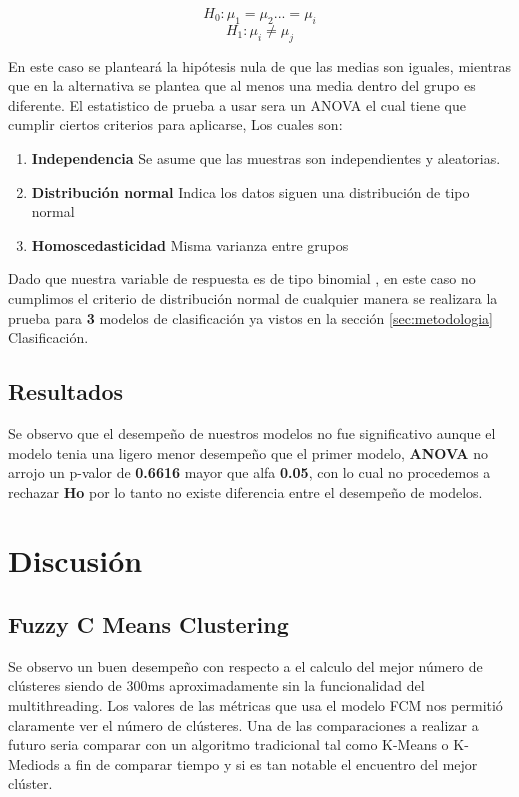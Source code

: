 \documentclass[10pt,journal]{IEEEtran}
\begin{document}
\begin{equation}
H_0 : \mu_1 = \mu_2 ... = \mu_i
\end{equation}
\begin{equation}
H_1 : \mu_i \neq \mu_j 
\end{equation}


En este caso se planteará la hipótesis nula de que las medias son iguales, mientras que en la alternativa se plantea que al menos una media dentro del grupo es diferente.
El estatistico de prueba a usar sera un ANOVA el cual tiene que cumplir ciertos criterios para aplicarse, Los cuales son:

\begin{enumerate}
    \item \textbf{Independencia} Se asume que las muestras son independientes y aleatorias.
    \item \textbf{Distribución normal} Indica los datos siguen una distribución de tipo normal
    \item \textbf{Homoscedasticidad} Misma varianza entre grupos 
\end{enumerate}

Dado que nuestra variable de respuesta es de tipo binomial , en este caso no cumplimos el criterio de distribución normal de cualquier manera se realizara la prueba para \textbf{3} modelos de clasificación ya vistos en la sección \ref{sec:metodologia} Clasificación. 

\subsection{Resultados}


Se observo que el desempeño de nuestros modelos no fue significativo aunque el modelo tenia una ligero menor desempeño que el primer modelo, \textbf{ANOVA} no arrojo un p-valor de \textbf{0.6616} mayor que alfa \textbf{0.05}, con lo cual no procedemos a rechazar \textbf{Ho} por lo tanto no existe diferencia entre el desempeño de modelos. 


\section{Discusión}

\subsection{Fuzzy C Means Clustering}

Se observo un buen desempeño con respecto a el calculo del mejor número de clústeres siendo de 300ms aproximadamente sin la funcionalidad del multithreading. Los valores de las métricas que usa el modelo FCM nos permitió claramente ver el número de clústeres.  Una de las comparaciones a realizar a futuro seria comparar con un algoritmo tradicional tal como K-Means o K-Mediods a fin de comparar tiempo y si es tan notable el encuentro del mejor clúster.
\end{document}
